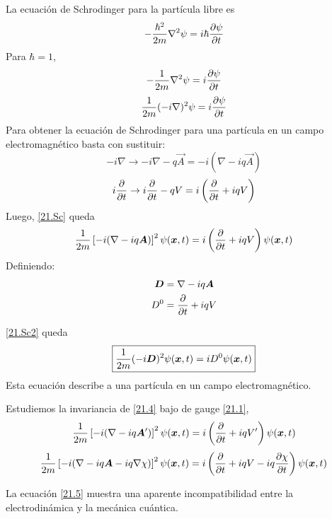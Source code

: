 La ecuación de Schrodinger para la partícula libre es 
\begin{equation}
  -\frac{\hbar^2}{2m}\nabla^2\psi =i\hbar\pdv{\psi}{t}
\end{equation}
Para $\hbar=1$,
\begin{equation}
  -\frac{1}{2m}\nabla^2\psi=i\pdv{\psi}{t}
\end{equation}
\begin{equation}\label{21.Sc}
  \frac{1}{2m}(-i\nabla)^2\psi=i\pdv{\psi}{t}
\end{equation}
Para obtener la ecuación de Schrodinger para una partícula en un campo electromagnético basta con sustituir:
\begin{equation}
  -i\nabla\to -i\nabla -q\vec{A}=-i\left(\nabla-iq\vec{A}\right)
\end{equation}
\begin{equation}
  i\pdv{t}\to i\pdv{t}-qV=i\left(\pdv{t}+iqV\right)
\end{equation}
Luego, \eqref{21.Sc} queda
\begin{equation}\label{21.Sc2}
  \frac{1}{2m}\left[-i(\nabla-iq\vb*{A})\right]^2\psi(\vb*{x},t) =
  i\left(\pdv{t}+iqV\right)\psi(\vb*{x},t) 
\end{equation}
Definiendo:
\begin{align}
  \vb*{D}&=\nabla -iq\vb*{A}\\
  D^0&=\pdv{t}+iqV
\end{align}

\eqref{21.Sc2} queda
\begin{equation}\label{21.4}
  \boxed{\frac{1}{2m}(-i\vb*{D})^2\psi(\vb*{x},t) =iD^0\psi(\vb*{x},t) }
\end{equation}
Esta ecuación describe a una partícula en un campo electromagnético.

Estudiemos la invariancia de \eqref{21.4} bajo de gauge \eqref{21.1}, 
\begin{equation}
  \frac{1}{2m}\left[-i(\nabla-iq\vb*{A}')\right]^2\psi(\vb*{x},t) =i\left(\pdv{t}+iqV'\right)\psi(\vb*{x},t) 
\end{equation}
\begin{equation}\label{21.5}
  \frac{1}{2m}\left[-i(\nabla-iq\vb*{A}-iq\nabla\chi )\right]^2\psi(\vb*{x},t) =i\left(\pdv{t}+iqV-iq\pdv{\chi }{t}\right)\psi(\vb*{x},t) 
\end{equation}

La ecuación \eqref{21.5} muestra una aparente incompatibilidad entre la electrodinámica y la mecánica cuántica.

